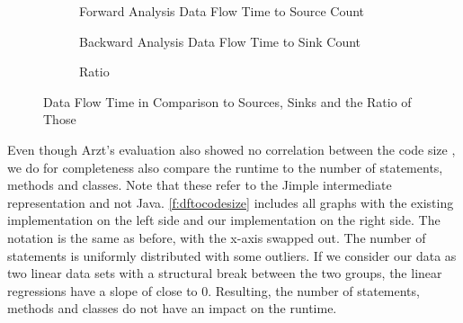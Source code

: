 \documentclass[../draft.tex]{subfiles}
\begin{document}
    \begin{figure}[tbp]
        \centering
        \begin{subfigure}[b]{0.45\textwidth}
            \centering
            \begin{subfigure}[]{\textwidth}
                \centering
                \resizebox{\columnwidth}{!}{
                    
                }
            \end{subfigure}
            \caption{Forward Analysis Data Flow Time to Source Count}
            \label{f:dfsources}
        \end{subfigure}
        \qquad
        \begin{subfigure}[b]{0.45\textwidth}
            \centering
            \begin{subfigure}[]{\textwidth}
                \centering
                \resizebox{\columnwidth}{!}{
                    
                }
            \end{subfigure}
            \caption{Backward Analysis Data Flow Time to Sink Count}
            \label{f:dfsinks}
        \end{subfigure}
        \bigbreak
        \begin{subfigure}[b]{\textwidth}
            \centering
            \begin{subfigure}[]{0.45\textwidth}
                \centering
                \resizebox{\columnwidth}{!}{
                    
                }
            \end{subfigure}
            \qquad
            \begin{subfigure}[]{0.45\textwidth}
                \centering
                \resizebox{\columnwidth}{!}{
                    
                }
            \end{subfigure}
            \caption{Ratio}
            \label{f:dfratio}
        \end{subfigure}
        \caption{Data Flow Time in Comparison to Sources, Sinks and the Ratio of Those}
        \label{f:dftoss}
    \end{figure}

    Even though Arzt's evaluation also showed no correlation between the code size \cite{Arzt2017PhD}, we do for completeness also compare the runtime to the number of statements, methods and classes.
    Note that these refer to the Jimple intermediate representation and not Java.
    \autoref{f:dftocodesize} includes all graphs with the existing implementation on the left side and our implementation on the right side.
    The notation is the same as before, with the x-axis swapped out.
    The number of statements is uniformly distributed with some outliers.
    If we consider our data as two linear data sets with a structural break between the two groups, the linear regressions have a slope of close to 0.
    Resulting, the number of statements, methods and classes do not have an impact on the runtime.
\end{document}
